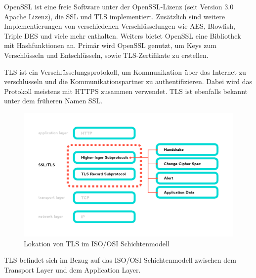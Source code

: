 
OpenSSL ist eine freie Software unter der OpenSSL-Lizenz (seit Version 3.0 Apache Lizenz), die SSL und TLS implementiert. Zusätzlich sind weitere Implementierungen von verschiedenen Verschlüsselungen wie AES, Blowfish, Triple DES und viele mehr enthalten. Weiters bietet OpenSSL eine Bibliothek mit Hashfunktionen an. Primär wird OpenSSL genutzt, um Keys zum Verschlüsseln und Entschlüsseln, sowie TLS-Zertifikate zu erstellen. 



TLS ist ein Verschlüsselungsprotokoll, um Kommunikation über das Internet zu verschlüsseln und die Kommunikationspartner zu authentifizieren. Dabei wird das Protokoll meistens mit HTTPS zusammen verwendet. TLS ist ebenfalls bekannt unter dem früheren Namen SSL.  

\begin{figure}[H]
    \centering
    \includegraphics{media/OpenSSL/info.png}
    \caption{Lokation von TLS im ISO/OSI Schichtenmodell \cite{BreakDownTLS}}
\end{figure}

TLS befindet sich im Bezug auf das ISO/OSI Schichtenmodell zwischen dem Transport Layer und dem Application Layer.


